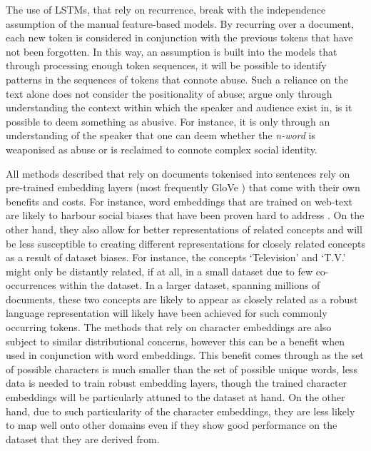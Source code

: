 The use of LSTMs, that rely on recurrence, break with the independence assumption of the manual feature-based models. By recurring over a document, each new token is considered in conjunction with the previous tokens that have not been forgotten. In this way, an assumption is built into the models that through processing enough token sequences, it will be possible to identify patterns in the sequences of tokens that connote abuse. Such a reliance on the text alone does not consider the positionality of abuse; \citet{Waseem:2018} argue only through understanding the context within which the speaker and audience exist in, is it possible to deem something as abusive. For instance, it is only through an understanding of the speaker that one can deem whether the \textit{n-word} is weaponised as abuse or is reclaimed to connote complex social identity.\vspace{5mm}

All methods described that rely on documents tokenised into sentences rely on pre-trained embedding layers (most frequently GloVe \citet{Pennington:2014}) that come with their own benefits and costs. For instance, word embeddings that are trained on web-text are likely to harbour social biases \citep{Bolukbasi:2016} that have been proven hard to address \citep{Gonen:2019}. On the other hand, they also allow for better representations of related concepts and will be less susceptible to creating different representations for closely related concepts as a result of dataset biases. For instance, the concepts `Television' and `T.V.' might only be distantly related, if at all, in a small dataset due to few co-occurrences within the dataset. In a larger dataset, spanning millions of documents, these two concepts are likely to appear as closely related as a robust language representation will likely have been achieved for such commonly occurring tokens.
The methods that rely on character embeddings are also subject to similar distributional concerns, however this can be a benefit when used in conjunction with word embeddings. 
This benefit comes through as the set of possible characters is much smaller than the set of possible unique words, less data is needed to train robust embedding layers, though the trained character embeddings will be particularly attuned to the dataset at hand. On the other hand, due to such particularity of the character embeddings, they are less likely to map well onto other domains even if they show good performance on the dataset that they are derived from.\vspace{5mm}

